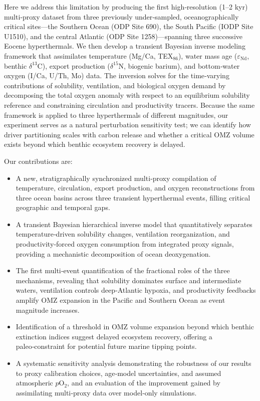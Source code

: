 \documentclass{article}
\begin{document}
Here we address this limitation by producing the first high‑resolution (1–2 kyr) multi‑proxy dataset from three previously under‑sampled, oceanographically critical sites—the Southern Ocean (ODP Site 690), the South Pacific (IODP Site U1510), and the central Atlantic (ODP Site 1258)—spanning three successive Eocene hyperthermals. We then develop a transient Bayesian inverse modeling framework that assimilates temperature (Mg/Ca, TEX$_{86}$), water mass age ($\varepsilon_{\text{Nd}}$, benthic $\delta^{13}$C), export production ($\delta^{15}$N, biogenic barium), and bottom‑water oxygen (I/Ca, U/Th, Mo) data. The inversion solves for the time‑varying contributions of solubility, ventilation, and biological oxygen demand by decomposing the total oxygen anomaly with respect to an equilibrium solubility reference and constraining circulation and productivity tracers. Because the same framework is applied to three hyperthermals of different magnitudes, our experiment serves as a natural perturbation sensitivity test; we can identify how driver partitioning scales with carbon release and whether a critical OMZ volume exists beyond which benthic ecosystem recovery is delayed.

Our contributions are:
\begin{itemize}
    \item A new, stratigraphically synchronized multi‑proxy compilation of temperature, circulation, export production, and oxygen reconstructions from three ocean basins across three transient hyperthermal events, filling critical geographic and temporal gaps.
    \item A transient Bayesian hierarchical inverse model that quantitatively separates temperature‑driven solubility changes, ventilation reorganization, and productivity‑forced oxygen consumption from integrated proxy signals, providing a mechanistic decomposition of ocean deoxygenation.
    \item The first multi‑event quantification of the fractional roles of the three mechanisms, revealing that solubility dominates surface and intermediate waters, ventilation controls deep‑Atlantic hypoxia, and productivity feedbacks amplify OMZ expansion in the Pacific and Southern Ocean as event magnitude increases.
    \item Identification of a threshold in OMZ volume expansion beyond which benthic extinction indices suggest delayed ecosystem recovery, offering a paleo‑constraint for potential future marine tipping points.
    \item A systematic sensitivity analysis demonstrating the robustness of our results to proxy calibration choices, age‑model uncertainties, and assumed atmospheric $p$O$_2$, and an evaluation of the improvement gained by assimilating multi‑proxy data over model‑only simulations.
\end{itemize}
\end{document}
